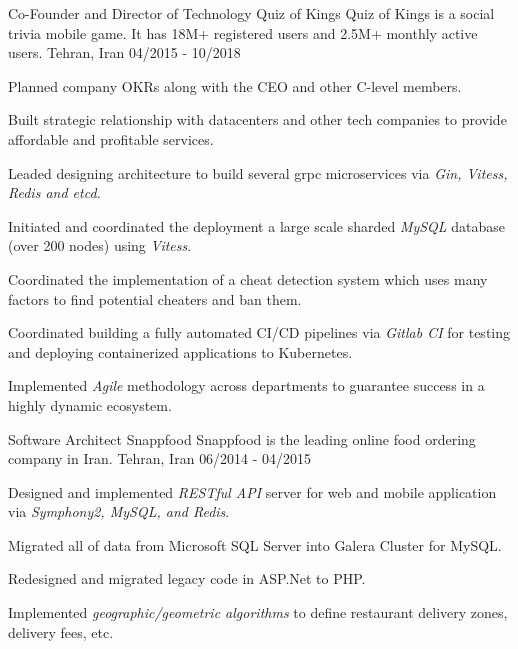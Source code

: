\begin{cventries}
  \cventry
    {Co-Founder and Director of Technology} %
    {Quiz of Kings} %
    {Quiz of Kings is a social trivia mobile game. It has 18M+ registered users and 2.5M+ monthly active users.}
    {Tehran, Iran} %
    {04/2015 - 10/2018} %
    {
      \begin{cvitems} %
        \item {Planned company OKRs along with the CEO and other C-level members.}
        \item {Built strategic relationship with datacenters and other tech companies to provide affordable and profitable services.}
        \item {Leaded designing architecture to build several grpc microservices via \emph{Gin, Vitess, Redis and etcd.}}
        \item {Initiated and coordinated the deployment a large scale sharded \emph{MySQL} database (over 200 nodes) using \emph{Vitess}.}
        \item {Coordinated the implementation of a cheat detection system which uses many factors to find potential cheaters and ban them.}
        \item {Coordinated building a fully automated CI/CD pipelines via \emph{Gitlab CI} for testing and deploying containerized applications to Kubernetes.}
        \item {Implemented \emph{Agile} methodology across departments to guarantee success in a highly dynamic ecosystem.}
      \end{cvitems}
    }

  \cventry
    {Software Architect} %
    {Snappfood} %
    {Snappfood is the leading online food ordering company in Iran.}
    {Tehran, Iran} %
    {06/2014 - 04/2015} %
    {
      \begin{cvitems} %
        \item {Designed and implemented \emph{RESTful API} server for web and mobile application via \emph{Symphony2, MySQL, and Redis}.}
        \item {Migrated all of data from Microsoft SQL Server into Galera Cluster for MySQL.}
        \item {Redesigned and migrated legacy code in ASP.Net to PHP.}
        \item {Implemented \emph{geographic/geometric algorithms} to define restaurant delivery zones, delivery fees, etc.}
      \end{cvitems}
    }


\end{cventries}
